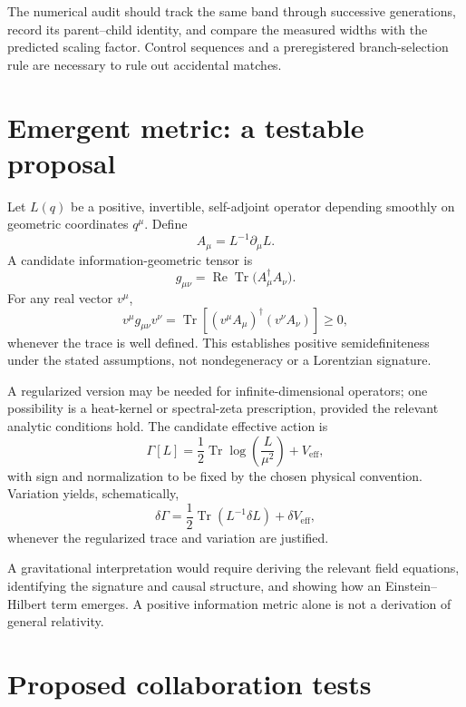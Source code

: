 \documentclass[11pt,a4paper]{article}
\newcommand{\Tr}{\operatorname{Tr}}
\begin{document}
The numerical audit should track the same band through successive generations,
record its parent--child identity, and compare the measured widths with the
predicted scaling factor. Control sequences and a preregistered branch-selection
rule are necessary to rule out accidental matches.

\section{Emergent metric: a testable proposal}

Let $L(q)$ be a positive, invertible, self-adjoint operator depending smoothly
on geometric coordinates $q^\mu$. Define
\begin{equation}
A_\mu=L^{-1}\partial_\mu L .
\end{equation}
A candidate information-geometric tensor is
\begin{equation}
g_{\mu\nu}=\operatorname{Re}\Tr\bigl(A_\mu^\dagger A_\nu\bigr).
\end{equation}
For any real vector $v^\mu$,
\begin{equation}
v^\mu g_{\mu\nu}v^\nu=\Tr\!\left[(v^\mu A_\mu)^\dagger(v^\nu A_\nu)\right]\geq0,
\end{equation}
whenever the trace is well defined. This establishes positive
semidefiniteness under the stated assumptions, not nondegeneracy or a Lorentzian
signature.

A regularized version may be needed for infinite-dimensional operators; one
possibility is a heat-kernel or spectral-zeta prescription, provided the
relevant analytic conditions hold. The candidate effective action is
\begin{equation}
\Gamma[L]=\frac12\Tr\log\!\left(\frac{L}{\mu^2}\right)+V_{\mathrm{eff}},
\end{equation}
with sign and normalization to be fixed by the chosen physical convention.
Variation yields, schematically,
\begin{equation}
\delta\Gamma=\frac12\Tr\!\left(L^{-1}\delta L\right)+\delta V_{\mathrm{eff}},
\end{equation}
whenever the regularized trace and variation are justified.

A gravitational interpretation would require deriving the relevant field
equations, identifying the signature and causal structure, and showing how an
Einstein--Hilbert term emerges. A positive information metric alone is not a
derivation of general relativity.

\section{Proposed collaboration tests}
\end{document}
